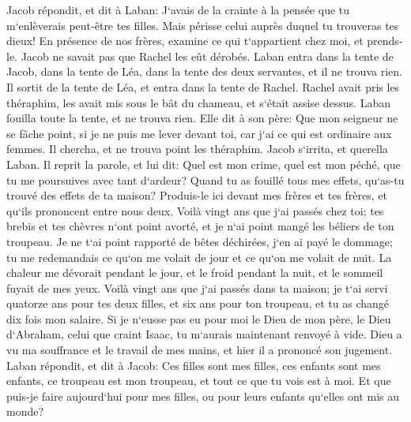 \verse Jacob répondit, et dit à Laban: J`avais de la crainte à la pensée que tu m`enlèverais peut-être tes filles. 
\verse Mais périsse celui auprès duquel tu trouveras tes dieux! En présence de nos frères, examine ce qui t`appartient chez moi, et prends-le. Jacob ne savait pas que Rachel les eût dérobés. 
\verse Laban entra dans la tente de Jacob, dans la tente de Léa, dans la tente des deux servantes, et il ne trouva rien. Il sortit de la tente de Léa, et entra dans la tente de Rachel. 
\verse Rachel avait pris les théraphim, les avait mis sous le bât du chameau, et s`était assise dessus. Laban fouilla toute la tente, et ne trouva rien. 
\verse Elle dit à son père: Que mon seigneur ne se fâche point, si je ne puis me lever devant toi, car j`ai ce qui est ordinaire aux femmes. Il chercha, et ne trouva point les théraphim. 
\verse Jacob s`irrita, et querella Laban. Il reprit la parole, et lui dit: Quel est mon crime, quel est mon péché, que tu me poursuives avec tant d`ardeur? 
\verse Quand tu as fouillé tous mes effets, qu`as-tu trouvé des effets de ta maison? Produis-le ici devant mes frères et tes frères, et qu`ils prononcent entre nous deux. 
\verse Voilà vingt ans que j`ai passés chez toi; tes brebis et tes chèvres n`ont point avorté, et je n`ai point mangé les béliers de ton troupeau. 
\verse Je ne t`ai point rapporté de bêtes déchirées, j`en ai payé le dommage; tu me redemandais ce qu`on me volait de jour et ce qu`on me volait de nuit. 
\verse La chaleur me dévorait pendant le jour, et le froid pendant la nuit, et le sommeil fuyait de mes yeux. 
\verse Voilà vingt ans que j`ai passés dans ta maison; je t`ai servi quatorze ans pour tes deux filles, et six ans pour ton troupeau, et tu as changé dix fois mon salaire. 
\verse Si je n`eusse pas eu pour moi le Dieu de mon père, le Dieu d`Abraham, celui que craint Isaac, tu m`aurais maintenant renvoyé à vide. Dieu a vu ma souffrance et le travail de mes mains, et hier il a prononcé son jugement. 
\verse Laban répondit, et dit à Jacob: Ces filles sont mes filles, ces enfants sont mes enfants, ce troupeau est mon troupeau, et tout ce que tu vois est à moi. Et que puis-je faire aujourd`hui pour mes filles, ou pour leurs enfants qu`elles ont mis au monde? 
